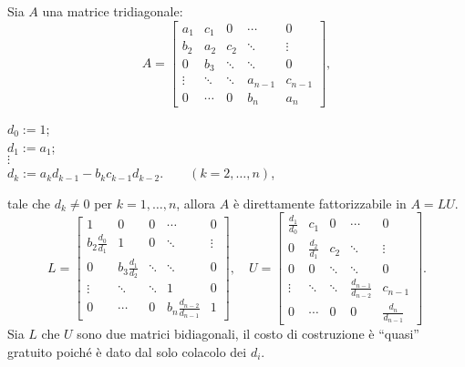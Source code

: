 \begin{prop}
Sia $A$ una matrice tridiagonale:
\[ A =
\left[ \begin{array}{ccccc}
a_1    & c_1    & 0      & \cdots & 0 \\
b_2    & a_2    & c_2    & \ddots & \vdots \\
0      & b_3    & \ddots & \ddots & 0 \\
\vdots & \ddots & \ddots & a_{n-1}& c_{n-1} \\
0      & \cdots & 0      & b_{n} & a_n
\end{array} \right],
\]
\begin{flushleft}
$d_0 :=  1$;   \\
$d_1 :=  a_1$; \\
$\vdots$      \\
$d_k :=  a_k d_{k-1} - b_kc_{k-1}d_{k-2}. \qquad (k = 2, \ldots, n)$,\\
\end{flushleft}
tale che $d_k \neq 0$ per $k = 1, \ldots , n$, allora $A$ è direttamente
fattorizzabile in $A = LU$.
\[ L =
\left[ \begin{array}{ccccc}
  1    & 0      & 0      & \cdots & 0 \\
b_2 \frac{d_0}{d_1}   &   1    & 0      & \ddots & \vdots \\
0      & b_3 \frac{d_1}{d_2}   & \ddots & \ddots & 0 \\
\vdots & \ddots & \ddots & 1      & 0 \\
0      & \cdots & 0      & b_{n}\frac{d_{n-2}}{d_{n-1}}   & 1
\end{array} \right],
\quad U =
\left[ \begin{array}{ccccc}
\frac{d_1}{d_0}   & c_1    & 0      & \cdots & 0 \\
0      & \frac{d_2}{d_1}    & c_2    & \ddots & \vdots \\
0      & 0      & \ddots & \ddots & 0 \\
\vdots & \ddots & \ddots & \frac{d_{n-1}}{d_{n-2}}& c_{n-1} \\
0      & \cdots & 0      & 0     & \frac{d_{n}}{d_{n-1}}
\end{array} \right].
\]
Sia $L$ che $U$ sono due matrici bidiagonali, il costo di costruzione è
``quasi'' gratuito poiché è dato dal solo colacolo dei $d_i$.
\end{prop}
